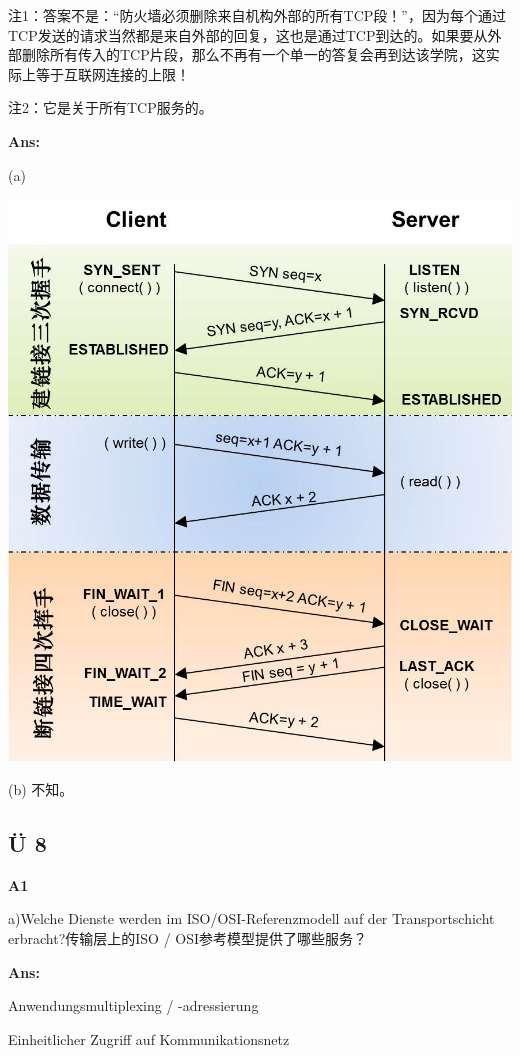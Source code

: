 \documentclass[fleqn]{article}
\begin{document}
注1：答案不是：“防火墙必须删除来自机构外部的所有TCP段！”，因为每个通过TCP发送的请求当然都是来自外部的回复，这也是通过TCP到达的。如果要从外部删除所有传入的TCP片段，那么不再有一个单一的答复会再到达该学院，这实际上等于互联网连接的上限！

注2：它是关于所有TCP服务的。

\textbf{Ans:}

(a) 
\begin{center}
    \includegraphics[scale=0.6]{bild7.jpg}
\end{center}

(b) 不知。

\subsection{Ü 8}

\noindent\textbf{A1}

a)Welche Dienste werden im ISO/OSI-Referenzmodell auf der Transportschicht erbracht?传输层上的ISO / OSI参考模型提供了哪些服务？

\textbf{Ans:}

\indent \indent Anwendungsmultiplexing / -adressierung 

\indent \indent Einheitlicher Zugriff auf Kommunikationsnetz 
\end{document}
